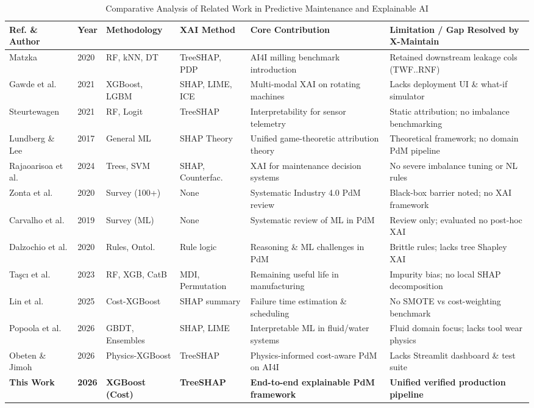 \documentclass[journal,10pt,twocolumn]{IEEEtran}
\begin{document}
\begin{table}[t]
\centering
\caption{Comparative Analysis of Related Work in Predictive Maintenance and Explainable AI}
\label{tab:related_work}
\begin{tabular}{llllll}
\toprule
\textbf{Ref. \& Author} & \textbf{Year} & \textbf{Methodology} & \textbf{XAI Method} & \textbf{Core Contribution} & \textbf{Limitation / Gap Resolved by X-Maintain} \\
\midrule
Matzka \cite{matzka2020} & 2020 & RF, kNN, DT & TreeSHAP, PDP & AI4I milling benchmark introduction & Retained downstream leakage cols (TWF..RNF) \\
Gawde et al. \cite{gawde2021} & 2021 & XGBoost, LGBM & SHAP, LIME, ICE & Multi-modal XAI on rotating machines & Lacks deployment UI \& what-if simulator \\
Steurtewagen \cite{steurtewagen2021} & 2021 & RF, Logit & TreeSHAP & Interpretability for sensor telemetry & Static attribution; no imbalance benchmarking \\
Lundberg \& Lee \cite{lundberg2017} & 2017 & General ML & SHAP Theory & Unified game-theoretic attribution theory & Theoretical framework; no domain PdM pipeline \\
Rajaoarisoa et al. \cite{rajaoarisoa2024} & 2024 & Trees, SVM & SHAP, Counterfac. & XAI for maintenance decision systems & No severe imbalance tuning or NL rules \\
Zonta et al. \cite{zonta2020} & 2020 & Survey (100+) & None & Systematic Industry 4.0 PdM review & Black-box barrier noted; no XAI framework \\
Carvalho et al. \cite{carvalho2019} & 2019 & Survey (ML) & None & Systematic review of ML in PdM & Review only; evaluated no post-hoc XAI \\
Dalzochio et al. \cite{dalzochio2020} & 2020 & Rules, Ontol. & Rule logic & Reasoning \& ML challenges in PdM & Brittle rules; lacks tree Shapley XAI \\
Taşcı et al. \cite{tasci2023} & 2023 & RF, XGB, CatB & MDI, Permutation & Remaining useful life in manufacturing & Impurity bias; no local SHAP decomposition \\
Lin et al. \cite{lin2025} & 2025 & Cost-XGBoost & SHAP summary & Failure time estimation \& scheduling & No SMOTE vs cost-weighting benchmark \\
Popoola et al. \cite{popoola2026} & 2026 & GBDT, Ensembles & SHAP, LIME & Interpretable ML in fluid/water systems & Fluid domain focus; lacks tool wear physics \\
Obeten \& Jimoh \cite{obeten2026} & 2026 & Physics-XGBoost & TreeSHAP & Physics-informed cost-aware PdM on AI4I & Lacks Streamlit dashboard \& test suite \\
\textbf{This Work} & \textbf{2026} & \textbf{XGBoost (Cost)} & \textbf{TreeSHAP} & \textbf{End-to-end explainable PdM framework} & \textbf{Unified verified production pipeline} \\
\bottomrule
\end{tabular}
\end{table}
\end{document}
